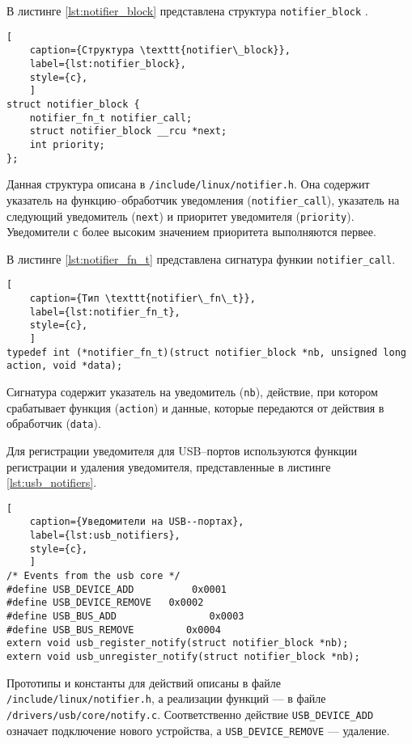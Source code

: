 В листинге \ref{lst:notifier_block} представлена структура \texttt{notifier\_block} \cite{notifier_block}.

\begin{lstlisting}[
	caption={Структура \texttt{notifier\_block}},
	label={lst:notifier_block},
	style={c},
	]
struct notifier_block {
	notifier_fn_t notifier_call;
	struct notifier_block __rcu *next;
	int priority;
};
\end{lstlisting}

Данная структура описана в \texttt{/include/linux/notifier.h}. Она содержит указатель на функцию--обработчик уведомления (\texttt{notifier\_call}), указатель на следующий уведомитель (\texttt{next}) и приоритет уведомителя (\texttt{priority}). Уведомители с более высоким значением приоритета выполняются первее.

В листинге \ref{lst:notifier_fn_t} представлена сигнатура функии \texttt{notifier\_call}.

\begin{lstlisting}[
	caption={Тип \texttt{notifier\_fn\_t}},
	label={lst:notifier_fn_t},
	style={c},
	]
typedef	int (*notifier_fn_t)(struct notifier_block *nb, unsigned long action, void *data);
\end{lstlisting}

Сигнатура содержит указатель на уведомитель (\texttt{nb}), действие, при котором срабатывает функция (\texttt{action}) и данные, которые передаются от действия в обработчик (\texttt{data}).

Для регистрации уведомителя для USB--портов используются функции регистрации и удаления уведомителя, представленные в листинге \ref{lst:usb_notifiers}.

\begin{lstlisting}[
	caption={Уведомители на USB--портах},
	label={lst:usb_notifiers},
	style={c},
	]
/* Events from the usb core */
#define USB_DEVICE_ADD		    0x0001
#define USB_DEVICE_REMOVE	0x0002
#define USB_BUS_ADD		           0x0003
#define USB_BUS_REMOVE		   0x0004
extern void usb_register_notify(struct notifier_block *nb);
extern void usb_unregister_notify(struct notifier_block *nb);
\end{lstlisting}

Прототипы и константы для действий описаны в файле\\ \texttt{/include/linux/notifier.h}, а реализации функций --- в файле\\ \texttt{/drivers/usb/core/notify.c}. Соответственно действие \texttt{USB\_DEVICE\_ADD} означает подключение нового устройства, а \texttt{USB\_DEVICE\_REMOVE} --- удаление.

